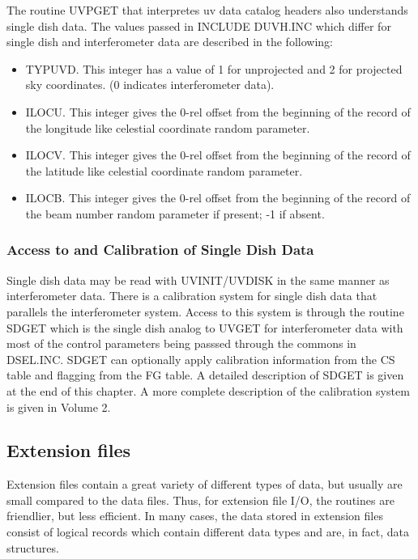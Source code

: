 The routine UVPGET that interpretes uv data catalog headers also
understands single dish data.  The values passed in INCLUDE DUVH.INC
which differ for single dish and interferometer data are described in
the following:
\begin{itemize} %
\item TYPUVD. This integer has a value of 1 for unprojected and 2 for
projected sky coordinates. (0 indicates interferometer data).
\item ILOCU.  This integer gives the 0-rel offset from the beginning
of the record of the longitude like celestial coordinate random
parameter.
\item ILOCV.  This integer gives the 0-rel offset from the beginning
of the record of the latitude like celestial coordinate random
parameter.
\item ILOCB.  This integer gives the 0-rel offset from the beginning
of the record of the beam number random parameter if present; -1 if
absent.
\end{itemize} %

\subsubsection{Access to and Calibration of Single Dish Data}

Single dish data may be read with UVINIT/UVDISK in the same manner as
interferometer data.  There is a calibration system for single dish
data that parallels the interferometer system.  Access to this system
is through the routine SDGET which is the single dish analog to UVGET
for interferometer data with most of the control parameters being
passsed through the commons in DSEL.INC.  SDGET can optionally apply
calibration information from the CS table and flagging from the FG
table.  A detailed description of SDGET is given at the end of this
chapter.  A more complete description of the calibration system is
given in Volume 2.


\subsection{Extension files}
Extension files contain a great variety of different types of data,
but usually are small compared to the data files.  Thus, for extension
file I/O, the routines are friendlier, but less efficient. In many
cases, the data stored in extension files consist of logical records
which contain different data types and are, in fact, data structures.

